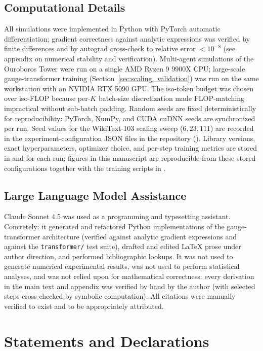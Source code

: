 \documentclass[11pt]{article}
\begin{document}
\subsection{Computational Details}
All simulations were implemented in Python with PyTorch automatic differentiation; gradient correctness against analytic expressions was verified by finite differences and by autograd cross-check to relative error $<10^{-8}$ (see appendix on numerical stability and verification). Multi-agent simulations of the Ouroboros Tower were run on a single AMD Ryzen 9 9900X CPU; large-scale gauge-transformer training (Section~\ref{sec:scaling_validation}) was run on the same workstation with an NVIDIA RTX 5090 GPU. The iso-token budget was chosen over iso-FLOP because per-$K$ batch-size discretization made FLOP-matching impractical without sub-batch padding. Random seeds are fixed deterministically for reproducibility: PyTorch, NumPy, and CUDA cuDNN seeds are synchronized per run. Seed values for the WikiText-103 scaling sweep ($6, 23, 111$) are recorded in the experiment-configuration JSON files in the repository (). Library versions, exact hyperparameters, optimizer choice, and per-step training metrics are stored in  and  for each run; figures in this manuscript are reproducible from these stored configurations together with the training scripts in .

\subsection{Large Language Model Assistance}
Claude Sonnet 4.5 was used as a programming and typesetting assistant. Concretely: it generated and refactored Python implementations of the gauge-transformer architecture (verified against analytic gradient expressions and against the \texttt{transformer/} test suite), drafted and edited LaTeX prose under author direction, and performed bibliographic lookups. It was not used to generate numerical experimental results, was not used to perform statistical analyses, and was not relied upon for mathematical correctness: every derivation in the main text and appendix was verified by hand by the author (with selected steps cross-checked by symbolic computation). All citations were manually verified to exist and to be appropriately attributed.

\section*{Statements and Declarations}
\end{document}
